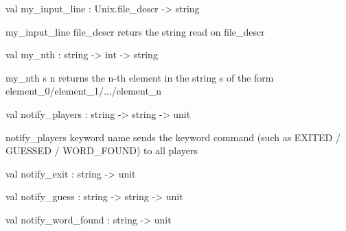 \documentclass[11pt]{article}
\begin{document}
\label{val:Server.my-underscoreinput-underscoreline}\begin{ocamldoccode}
val my_input_line : Unix.file_descr -> string
\end{ocamldoccode}
\begin{ocamldocdescription}
my\_input\_line file\_descr returs the string read on file\_descr


\end{ocamldocdescription}




\label{val:Server.my-underscorenth}\begin{ocamldoccode}
val my_nth : string -> int -> string
\end{ocamldoccode}
\begin{ocamldocdescription}
my\_nth s n returns the n-th element in the string s of the form element\_0/element\_1/$\ldots$/element\_n


\end{ocamldocdescription}




\label{val:Server.notify-underscoreplayers}\begin{ocamldoccode}
val notify_players : string -> string -> unit
\end{ocamldoccode}
\begin{ocamldocdescription}
notify\_players keyword name sends the keyword command (such as EXITED / GUESSED / WORD\_FOUND) to all players


\end{ocamldocdescription}




\label{val:Server.notify-underscoreexit}\begin{ocamldoccode}
val notify_exit : string -> unit
\end{ocamldoccode}




\label{val:Server.notify-underscoreguess}\begin{ocamldoccode}
val notify_guess : string -> string -> unit
\end{ocamldoccode}




\label{val:Server.notify-underscoreword-underscorefound}\begin{ocamldoccode}
val notify_word_found : string -> unit
\end{ocamldoccode}
\end{document}
